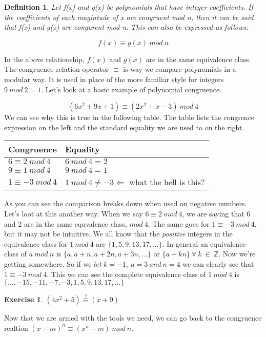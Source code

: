 \documentclass[11pt]{article}
\newtheorem{ex}{Exercise}
\newtheorem{definition}{Definition}
\begin{document}
\begin{definition}
Let f(x) and g(x) be polynomials  that have integer coefficients. If the coefficients of each magintude of x are congruent mod n, then it can be said that f(x) and g(x) are congurent mod n. This can also be expressed as follows:

$$f(x) \equiv g(x)\ mod\ n$$
 
\end{definition}

In the above relationship, $f(x)$ and $g(x)$ are in the same equivalence class. The congruence relation operator $\equiv$ is way we compare polynomials in a modular way. It is used in place of the more familiar style for integers $ 9\ mod\ 2 = 1 $. Let's look at a basic example of polynomial congruence.

$$(6x^2+9x+1) \equiv (2x^2+x-3)\ mod\ 4$$ We can see why this is true in the following table. The table lists the congrence expression on the left and the standard equality we are used to on the right. 

\begin{center}
    \begin{tabular}{ | l | l |}
    \hline
	Congruence & Equality \\ \hline
	$ 6 \equiv 2\ mod\ 4 $ & $6\ mod\ 4=2$\\ \hline
	$ 9 \equiv 1\ mod\ 4 $ & $9\ mod\ 4=1$\\ \hline
	$ 1 \equiv -3\ mod\ 4 $ & $1\ mod\ 4\not=-3\Leftarrow$ what the hell is this?\\ \hline
    \end{tabular}
\end{center}

As you can see the comparison breaks down when used on negative numbers. Let's loot at this another way. When we say $6 \equiv 2\ mod\ 4$, we are saying that 6 and 2 are in the same equvalence class, $mod\ 4$. The same goes for $1 \equiv-3\ mod\ 4$, but it may not be intuitive. We all know that the \emph{positive} integers in the equivalence class for $1\ mod\ 4$ are $\{1,5,9,13,17,...\}$. In general an equivalence class of $a\ mod\ n$ is $\{a,a+n,a+2n,a+3n,...\}$ or $\{a+kn\}\ \forall\ k\ \in\ \mathbb{Z}$. Now we're getting somewhere. So if we $let\ k = -1,\ a = 3\ and\ n = 4$ we can clearly see that $1 \equiv -3\ mod\ 4$. This we can see the complete equivalence class of $1\ mod\ 4$ is $\{...,-15,-11,-7,-3,1,5,9,13,17,...\}$

\begin{ex}
$(4x^2+5) \stackrel{?}{\equiv} (x+9)$
\end{ex}
\vspace{10pc}
Now that we are armed with the tools we need, we can go back to the congruence realtion $(x-m)^n \equiv (x^n -m)\ mod\ n$.
\end{document}
